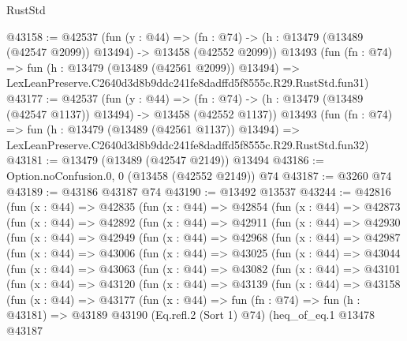 \begin{lexlean}{RustStd}
\begin{coremodule}
@43158 := @42537
    (fun (y : @44) =>
    (fn : @74) -> (h : @13479 (@13489 (@42547 @2099)) @13494) -> @13458 (@42552 @2099))
    @13493
    (fun (fn : @74) =>
    fun (h : @13479 (@13489 (@42561 @2099)) @13494) =>
    LexLeanPreserve.C2640d3d8b9ddc241fe8dadffd5f8555c.R29.RustStd.fun31)
@43177 := @42537
    (fun (y : @44) =>
    (fn : @74) -> (h : @13479 (@13489 (@42547 @1137)) @13494) -> @13458 (@42552 @1137))
    @13493
    (fun (fn : @74) =>
    fun (h : @13479 (@13489 (@42561 @1137)) @13494) =>
    LexLeanPreserve.C2640d3d8b9ddc241fe8dadffd5f8555c.R29.RustStd.fun32)
@43181 := @13479 (@13489 (@42547 @2149)) @13494
@43186 := Option.noConfusion.{0, 0} (@13458 (@42552 @2149)) @74
@43187 := @3260 @74
@43189 := @43186 @43187 @74
@43190 := @13492 @13537
@43244 := @42816
    (fun (x : @44) =>
    @42835
      (fun (x : @44) =>
      @42854
        (fun (x : @44) =>
        @42873
          (fun (x : @44) =>
          @42892
            (fun (x : @44) =>
            @42911
              (fun (x : @44) =>
              @42930
                (fun (x : @44) =>
                @42949
                  (fun (x : @44) =>
                  @42968
                    (fun (x : @44) =>
                    @42987
                      (fun (x : @44) =>
                      @43006
                        (fun (x : @44) =>
                        @43025
                          (fun (x : @44) =>
                          @43044
                            (fun (x : @44) =>
                            @43063
                              (fun (x : @44) =>
                              @43082
                                (fun (x : @44) =>
                                @43101
                                  (fun (x : @44) =>
                                  @43120
                                    (fun (x : @44) =>
                                    @43139
                                      (fun (x : @44) =>
                                      @43158
                                        (fun (x : @44) =>
                                        @43177
                                          (fun (x : @44) =>
                                          fun (fn : @74) =>
                                          fun (h : @43181) =>
                                          @43189
                                            @43190
                                            (Eq.refl.{2} (Sort 1) @74)
                                            (heq_of_eq.{1}
                                              @13478
                                              @43187

\end{coremodule}
\end{lexlean}
